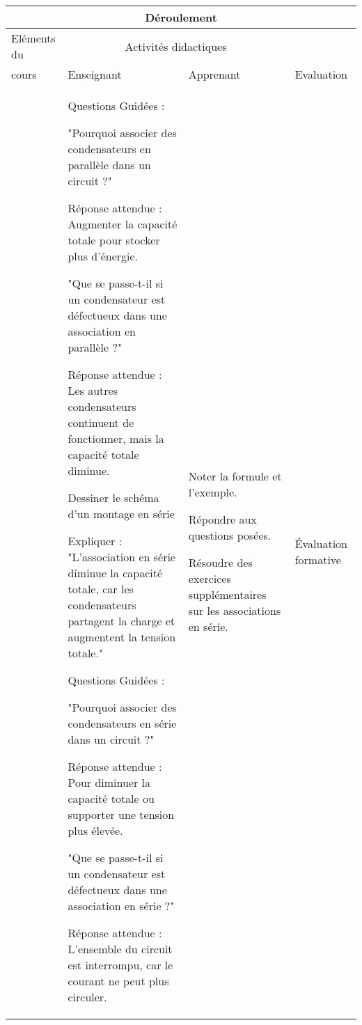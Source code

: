 \documentclass[12pt]{article}
\begin{document}

\begin{center}
	\begin{tabular}{|p{}||p{}||p{}||p{}|}
		\hline
		\multicolumn{4}{|c|}{Déroulement}                                                  \\\hline
		Eléments du & \multicolumn{2}{c||}{Activités didactiques} &                        \\\cline{2-3}
		cours       & Enseignant                                  & Apprenant & Evaluation \\\hline


		            &

Questions Guidées :

"Pourquoi associer des condensateurs en parallèle dans un circuit ?"

Réponse attendue : Augmenter la capacité totale pour stocker plus d’énergie.

"Que se passe-t-il si un condensateur est défectueux dans une association en parallèle ?"

Réponse attendue : Les autres condensateurs continuent de fonctionner, mais la capacité totale diminue.


Dessiner le schéma d’un montage en série

Expliquer :
"L’association en série diminue la capacité totale, car les condensateurs partagent la charge et augmentent la tension totale."

Questions Guidées :

"Pourquoi associer des condensateurs en série dans un circuit ?"

Réponse attendue : Pour diminuer la capacité totale ou supporter une tension plus élevée.

"Que se passe-t-il si un condensateur est défectueux dans une association en série ?"

Réponse attendue : L’ensemble du circuit est interrompu, car le courant ne peut plus circuler.


		            &

Noter la formule et l’exemple.

Répondre aux questions posées.

Résoudre des exercices supplémentaires sur les associations en série.
		            &
		Évaluation formative                                                               \\\hline


	\end{tabular}
\end{center}
\end{document}
